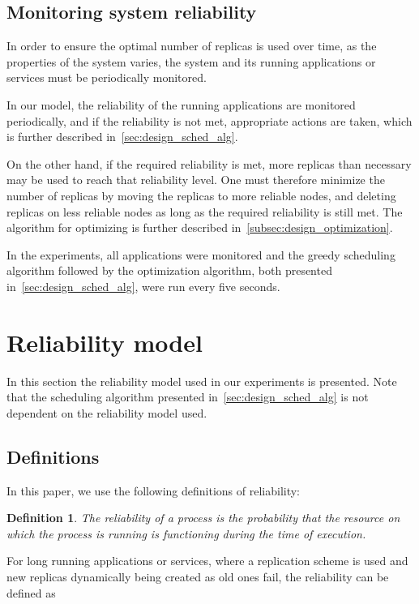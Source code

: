 \documentclass{cslthse-msc}
\newtheorem{definition}{Definition}[chapter]
\begin{document}
\subsection{Monitoring system reliability} \label{subsec:monitoring_system_rel}
In order to ensure the optimal number of replicas is used over time, as the properties of the system varies, the system and its running applications or services must be periodically monitored. 

In our model, the reliability of the running applications are monitored periodically, and if the reliability is not met, appropriate actions are taken, which is further described in~\cref{sec:design_sched_alg}.

On the other hand, if the required reliability is met, more replicas than necessary may be used to reach that reliability level. One must therefore minimize the number of replicas by moving the replicas to more reliable nodes, and deleting replicas on less reliable nodes as long as the required reliability is still met. The algorithm for optimizing is further described in~\cref{subsec:design_optimization}.

In the experiments, all applications were monitored and the greedy scheduling algorithm followed by the optimization algorithm, both presented in~\cref{sec:design_sched_alg}, were run every five seconds.

\section{Reliability model} \label{sec:design_reliability_model}
In this section the reliability model used in our experiments is presented. Note that the scheduling algorithm presented in~\cref{sec:design_sched_alg} is not dependent on the reliability model used.

\subsection{Definitions} \label{subsec:design_definitions}
In this paper, we use the following definitions of reliability:
\begin{definition} \label{def:single_task_reliability}
The reliability of a process is the probability that the resource on which the process is running is functioning during the time of execution.
\end{definition}

For long running applications or services, where a replication scheme is used and new replicas dynamically being created as old ones fail, the reliability can be defined as \cite{effTaskReplMobGrid}
\end{document}
